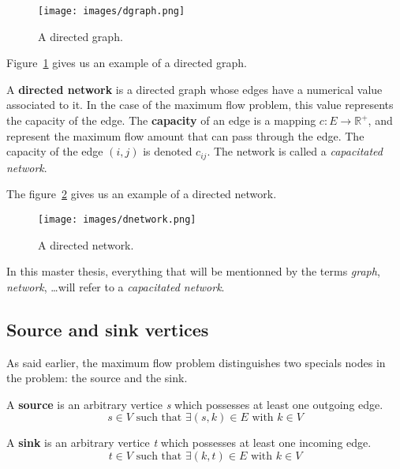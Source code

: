 \begin{figure}
\centering
\texttt{[image: images/dgraph.png]}
\caption{A directed graph.}
\label{img:dgraph}
\end{figure}

Figure~\ref{img:dgraph} gives us an example of a directed graph.

\begin{definition}
\label{dnetwork}
A \textbf{directed network} is a directed graph whose edges have a numerical value associated to it. In the case of the maximum flow problem, this value represents the capacity of the edge. The \textbf{capacity} of an edge is a mapping $c: E \to \mathbb{R}^{+}$, and represent the maximum flow amount that can pass through the edge. The capacity of the edge $(i, j)$ is denoted $c_{ij}$. The network is called a \textit{capacitated network}.
\end{definition}

The figure~\ref{img:dnetwork} gives us an example of a directed network. \\

\begin{figure}
\centering
\texttt{[image: images/dnetwork.png]}
\caption{A directed network.}
\label{img:dnetwork}
\end{figure}



In this master thesis, everything that will be mentionned by the terms \textit{graph}, \textit{network}, \dots will refer to a \textit{capacitated network}.

\subsection{Source and sink vertices}
As said earlier, the maximum flow problem distinguishes two specials nodes in the problem: the source and the sink.

\begin{definition}
\label{source}
A \textbf{source} is an arbitrary vertice \textit{s} which possesses at least one outgoing edge.
$$s \in V \text{ such that } \exists (s, k) \in E \text{ with } k \in V$$
\end{definition}

\begin{definition}
\label{sink}
A \textbf{sink} is an arbitrary vertice \textit{t} which possesses at least one incoming edge. 
$$t \in V \text{ such that } \exists (k, t) \in E \text{ with } k \in V$$
\end{definition}

